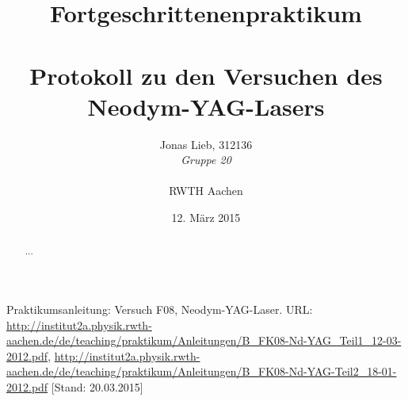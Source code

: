 \documentclass{../Misc/MontavonLaTeX/Montavon}
\date{12. März 2015}
\begin{document}
\title{Fortgeschrittenenpraktikum \\ \quad \\ Protokoll zu den Versuchen des Neodym-YAG-Lasers}
\author{Jonas Lieb, 312136 \\ \emph{Gruppe 20} \\ \\  RWTH Aachen}
\maketitle

\begin{abstract}
...
\end{abstract}
\newpage

\tableofcontents
\newpage



\newpage
\begin{thebibliography}{xxxx}
 Praktikumsanleitung:
Versuch F08, Neodym-YAG-Laser. URL: \url{http://institut2a.physik.rwth-aachen.de/de/teaching/praktikum/Anleitungen/B_FK08-Nd-YAG_Teil1_12-03-2012.pdf}, \url{http://institut2a.physik.rwth-aachen.de/de/teaching/praktikum/Anleitungen/B_FK08-Nd-YAG-Teil2_18-01-2012.pdf} [Stand: 20.03.2015]
\end{thebibliography}
\end{document}
